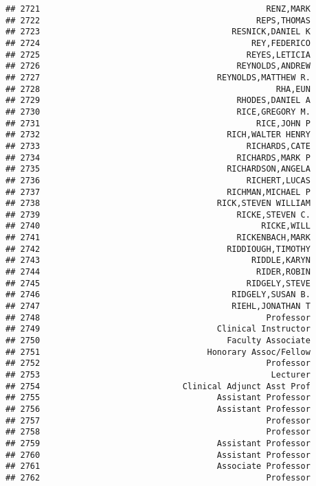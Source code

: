 \documentclass[
]{article}
\begin{document}
\begin{verbatim}
## 2721                                              RENZ,MARK
## 2722                                            REPS,THOMAS
## 2723                                       RESNICK,DANIEL K
## 2724                                           REY,FEDERICO
## 2725                                          REYES,LETICIA
## 2726                                        REYNOLDS,ANDREW
## 2727                                    REYNOLDS,MATTHEW R.
## 2728                                                RHA,EUN
## 2729                                        RHODES,DANIEL A
## 2730                                        RICE,GREGORY M.
## 2731                                            RICE,JOHN P
## 2732                                      RICH,WALTER HENRY
## 2733                                          RICHARDS,CATE
## 2734                                        RICHARDS,MARK P
## 2735                                      RICHARDSON,ANGELA
## 2736                                          RICHERT,LUCAS
## 2737                                      RICHMAN,MICHAEL P
## 2738                                    RICK,STEVEN WILLIAM
## 2739                                        RICKE,STEVEN C.
## 2740                                             RICKE,WILL
## 2741                                        RICKENBACH,MARK
## 2742                                      RIDDIOUGH,TIMOTHY
## 2743                                           RIDDLE,KARYN
## 2744                                            RIDER,ROBIN
## 2745                                          RIDGELY,STEVE
## 2746                                       RIDGELY,SUSAN B.
## 2747                                       RIEHL,JONATHAN T
## 2748                                              Professor
## 2749                                    Clinical Instructor
## 2750                                      Faculty Associate
## 2751                                  Honorary Assoc/Fellow
## 2752                                              Professor
## 2753                                               Lecturer
## 2754                             Clinical Adjunct Asst Prof
## 2755                                    Assistant Professor
## 2756                                    Assistant Professor
## 2757                                              Professor
## 2758                                              Professor
## 2759                                    Assistant Professor
## 2760                                    Assistant Professor
## 2761                                    Associate Professor
## 2762                                              Professor

\end{verbatim}
\end{document}
